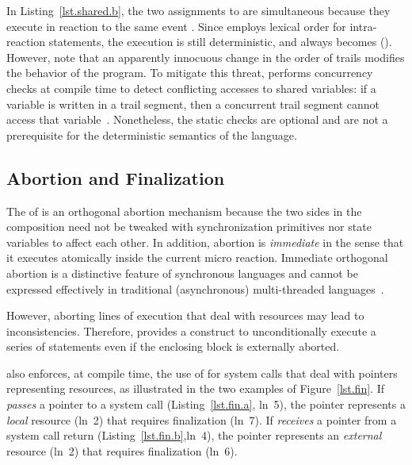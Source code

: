 In Listing~\ref{lst.shared.b}, the two assignments to  are simultaneous because
they execute in reaction to the same event .
Since \CEU employs lexical order for intra-reaction statements, the execution
is still deterministic, and  always becomes  ().
%
However, note that an apparently innocuous change in the order of trails
modifies the behavior of the program.
%
To mitigate this threat, \CEU performs concurrency checks at compile time to
detect conflicting accesses to shared variables:
if a variable is written in a trail segment, then a concurrent trail segment
cannot access that variable~\cite{ceu.sensys13}.
%
Nonetheless, the static checks are optional and are not a prerequisite for the
deterministic semantics of the language.

\subsection{Abortion and Finalization}
\label{sec.ceu.fin}

The  of \CEU is an orthogonal abortion mechanism because the two
sides in the composition need not be tweaked with synchronization primitives nor
state variables to affect each other.
%
In addition, abortion is \emph{immediate} in the sense that it executes
atomically inside the current micro reaction.
%
Immediate orthogonal abortion is a distinctive feature of synchronous languages
and cannot be expressed effectively in traditional (asynchronous)
multi-threaded languages~\cite{esterel.preemption,sync_async.threadsstop}.

However, aborting lines of execution that deal with resources may lead to
inconsistencies.
%
Therefore, \CEU provides a  construct to unconditionally
execute a series of statements even if the enclosing block is externally
aborted.

\CEU also enforces, at compile time, the use of  for system
calls that deal with pointers representing resources, as illustrated in the two
examples of Figure~\ref{lst.fin}.
%
 If \CEU \emph{passes} a pointer to a system call (Listing~\ref{lst.fin.a},
    ln~5), the pointer represents a \emph{local} resource (ln~2) that
    requires finalization (ln~7).
 If \CEU \emph{receives} a pointer from a system call return
    (Listing~\ref{lst.fin.b},ln~4), the pointer represents an
    \emph{external} resource (ln~2) that requires finalization (ln~6).

